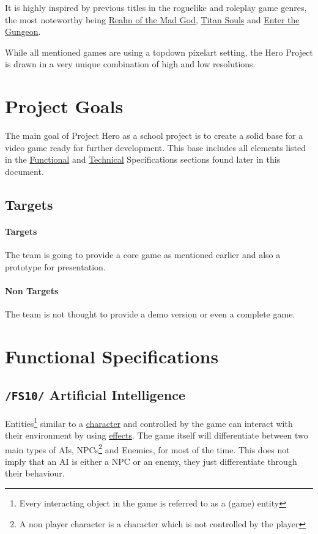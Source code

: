 \documentclass[11pt]{article}
\begin{document}
It is highly inspired by previous titles in the roguelike and roleplay game genres, the most noteworthy being \href{https://realmofthemadgod.com}{Realm of the Mad God}, \href{http://www.devolverdigital.com/games/view/titan-souls}{Titan Souls} and \href{http://dodgeroll.com/gungeon/}{Enter the Gungeon}.

While all mentioned games are using a topdown pixelart setting, the Hero Project is drawn in a very unique combination of high and low resolutions.

\section{Project Goals}
The main goal of Project Hero as a school project is to create a solid base for a video game ready for further development.
This base includes all elements listed in the \hyperref[sec:fs]{Functional} and \hyperref[sec:ts]{Technical} Specifications sections found later in this document.

\subsection{Targets}
\paragraph{Targets}
The team is going to provide a core game as mentioned earlier and also a prototype for presentation.
\paragraph{Non Targets}
The team is not thought to provide a demo version or even a complete game.

\newpage

\section{Functional Specifications}\label{sec:fs}
\subsection{\texttt{/FS10/} Artificial Intelligence}\label{subsec:fs10ai}
Entities\footnote{Every interacting object in the game is referred to as a (game) entity} similar to a \hyperref[subsec:fs20character]{character} and controlled by the game can interact with their environment by using \hyperref[subsec:fs30effects]{effects}.
The game itself will differentiate between two main types of AIs, NPCs\footnote{A non player character is a character which is not controlled by the player} and Enemies, for most of the time. 
This does not imply that an AI is either a NPC or an enemy, they just differentiate through their behaviour.
\end{document}
